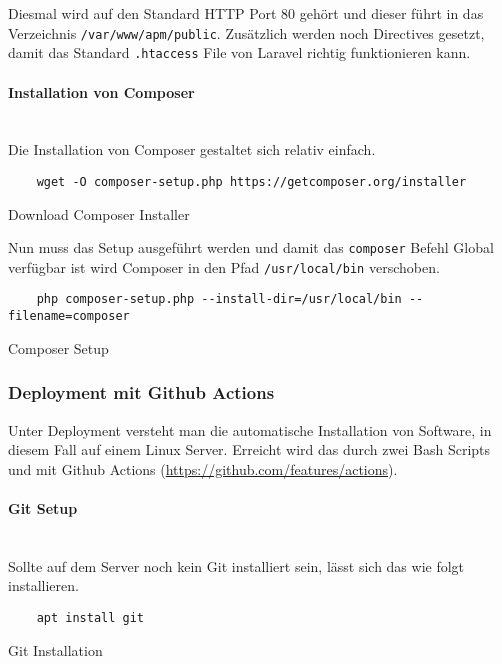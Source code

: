 Diesmal wird auf den Standard HTTP Port 80 gehört und dieser führt in das
Verzeichnis \verb|/var/www/apm/public|. Zusätzlich werden noch Directives
gesetzt, damit das Standard \verb|.htaccess| File von Laravel richtig
funktionieren kann.

\paragraph{Installation von Composer}\mbox{}\\

Die Installation von Composer gestaltet sich relativ einfach.

\begin{listing}[H]
  \begin{verbatim}
    wget -O composer-setup.php https://getcomposer.org/installer
  \end{verbatim}
  \caption{Download Composer Installer}
\end{listing}

Nun muss das Setup ausgeführt werden und damit das \verb|composer| Befehl Global
verfügbar ist wird Composer in den Pfad \verb|/usr/local/bin| verschoben.

\begin{listing}[H]
  \begin{verbatim}
    php composer-setup.php --install-dir=/usr/local/bin --filename=composer
  \end{verbatim}
  \caption{Composer Setup}
\end{listing}


\subsubsection{Deployment mit Github Actions}
Unter Deployment versteht man die automatische Installation von Software, in
diesem Fall auf einem Linux Server. Erreicht wird das durch zwei Bash Scripts
und mit Github Actions (\url{https://github.com/features/actions}).

\paragraph{Git Setup}\mbox{}\\

Sollte auf dem Server noch kein Git installiert sein, lässt sich das wie folgt
installieren.

\begin{listing}[H]
  \begin{verbatim}
    apt install git
  \end{verbatim}
  \caption{Git Installation}
\end{listing}

